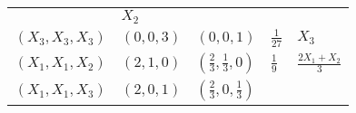 \documentclass[
]{book}
\theoremstyle{definition}
\theoremstyle{definition}
\theoremstyle{definition}
\theoremstyle{remark}
\begin{document}
\begin{longtable}[]{@{}lllll@{}}
\begin{minipage}[t]{0.17\columnwidth}
\end{minipage} & \begin{minipage}[t]{0.18\columnwidth}\raggedright
\(X_2\)\strut
\end{minipage}\tabularnewline
\begin{minipage}[t]{0.18\columnwidth}\raggedright
\(\left( X_3,X_3,X_3 \right)\)\strut
\end{minipage} & \begin{minipage}[t]{0.16\columnwidth}\raggedright
\(\left( 0,0,3 \right)\)\strut
\end{minipage} & \begin{minipage}[t]{0.16\columnwidth}\raggedright
\(\left(0,0,1 \right)\)\strut
\end{minipage} & \begin{minipage}[t]{0.17\columnwidth}\raggedright
\(\frac{1}{27}\)\strut
\end{minipage} & \begin{minipage}[t]{0.18\columnwidth}\raggedright
\(X_3\)\strut
\end{minipage}\tabularnewline
\begin{minipage}[t]{0.18\columnwidth}\raggedright
\(\left( X_1,X_1,X_2 \right)\)\strut
\end{minipage} & \begin{minipage}[t]{0.16\columnwidth}\raggedright
\(\left( 2,1,0 \right)\)\strut
\end{minipage} & \begin{minipage}[t]{0.16\columnwidth}\raggedright
\(\left( \frac{2}{3},\frac{1}{3},0 \right)\)\strut
\end{minipage} & \begin{minipage}[t]{0.17\columnwidth}\raggedright
\(\frac{1}{9}\)\strut
\end{minipage} & \begin{minipage}[t]{0.18\columnwidth}\raggedright
\(\frac{2X_1+X_2}{3}\)\strut
\end{minipage}\tabularnewline
\begin{minipage}[t]{0.18\columnwidth}\raggedright
\(\left( X_1,X_1,X_3 \right)\)\strut
\end{minipage} & \begin{minipage}[t]{0.16\columnwidth}\raggedright
\(\left( 2,0,1 \right)\)\strut
\end{minipage} & \begin{minipage}[t]{0.16\columnwidth}\raggedright
\(\left( \frac{2}{3},0,\frac{1}{3} \right)\)\strut
\end{minipage} & \begin{minipage}[t]{0.17\columnwidth}\raggedright

\end{minipage}
\end{longtable}
\end{document}
